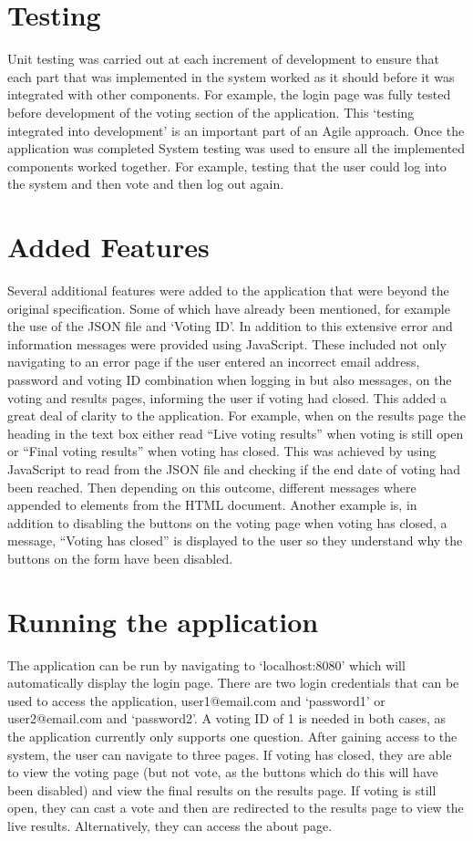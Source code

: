 \documentclass[11pt,oneside,a4paper]{article}
\begin{document}
\section*{Testing}
Unit testing was carried out at each increment of development to ensure that each part that was implemented in the system worked as it should before it was integrated with other components. For example, the login page was fully tested before development of the voting section of the application. This ‘testing integrated into development’ is an important part of an Agile approach. Once the application was completed System testing was used to ensure all the implemented components worked together. For example, testing that the user could log into the system and then vote and then log out again.

\section*{Added Features}
Several additional features were added to the application that were beyond the original specification. Some of which have already been mentioned, for example the use of the JSON file and ‘Voting ID’. In addition to this extensive error and information messages were provided using JavaScript. These included not only navigating to an error page if the user entered an incorrect email address, password and voting ID combination when logging in but also messages, on the voting and results pages, informing the user if voting had closed. This added a great deal of clarity to the application. For example, when on the results page the heading in the text box either read “Live voting results” when voting is still open or “Final voting results” when voting has closed. This was achieved by using JavaScript to read from the JSON file and checking if the end date of voting had been reached. Then depending on this outcome, different messages where appended to elements from the HTML document. Another example is, in addition to disabling the buttons on the voting page when voting has closed, a message, “Voting has closed” is displayed to the user so they understand why the buttons on the form have been disabled. 

\section*{Running the application}
The application can be run by navigating to ‘localhost:8080’ which will automatically display the login page. There are two login credentials that can be used to access the application, user1@email.com and ‘password1’ or user2@email.com and ‘password2’. A voting ID of 1 is needed in both cases, as the application currently only supports one question. After gaining access to the system, the user can navigate to three pages. If voting has closed, they are able to view the voting page (but not vote, as the buttons which do this will have been disabled) and view the final results on the results page. If voting is still open, they can cast a vote and then are redirected to the results page to view the live results. Alternatively, they can access the about page. 
\end{document}
